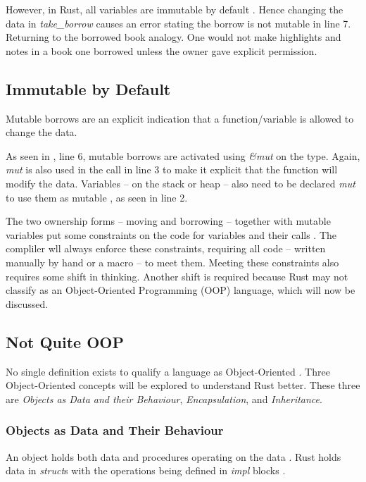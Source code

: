 However, in Rust, all variables are immutable by default \cite{klabnik_2019_01}.
Hence changing the data in \textit{take\_borrow} causes an error stating the borrow is not mutable in line 7.
Returning to the borrowed book analogy.
One would not make highlights and notes in a book one borrowed unless the owner gave explicit permission.

\subsection{Immutable by Default}
Mutable borrows are an explicit indication that a function/variable is allowed to change the data.


As seen in , line 6, mutable borrows are activated using \textit{\&mut } on the type.
Again, \textit{mut} is also used in the call in line 3 to make it explicit that the function will modify the data.
Variables -- on the stack or heap -- also need to be declared \textit{mut} to use them as mutable \cite{klabnik_2019_01}, as seen in line 2.

The two ownership forms -- moving and borrowing -- together with mutable variables put some constraints on the code for variables and their calls \cite{klabnik_2019_01}.
The compliler wll always enforce these constraints, requiring all code -- written manually by hand or a macro -- to meet them.
Meeting these constraints also requires some shift in thinking.
Another shift is required because Rust may not classify as an Object-Oriented Programming (OOP) language, which will now be discussed.

\subsection{Not Quite OOP}
No single definition exists to qualify a language as Object-Oriented \cite{meyer_97_01,stefik_85_01,gamma_94_01,klabnik_2019_01}.
Three Object-Oriented concepts will be explored to understand Rust better.
These three are \textit{Objects as Data and their Behaviour}, \textit{Encapsulation}, and \textit{Inheritance}.

\subsubsection{Objects as Data and Their Behaviour}
An object holds both data and procedures operating on the data \cite{meyer_97_01,stefik_85_01,gamma_94_01,malik_09_01}.
Rust holds data in \textit{struct}s with the operations being defined in \textit{impl} blocks \cite{klabnik_2019_01}.

